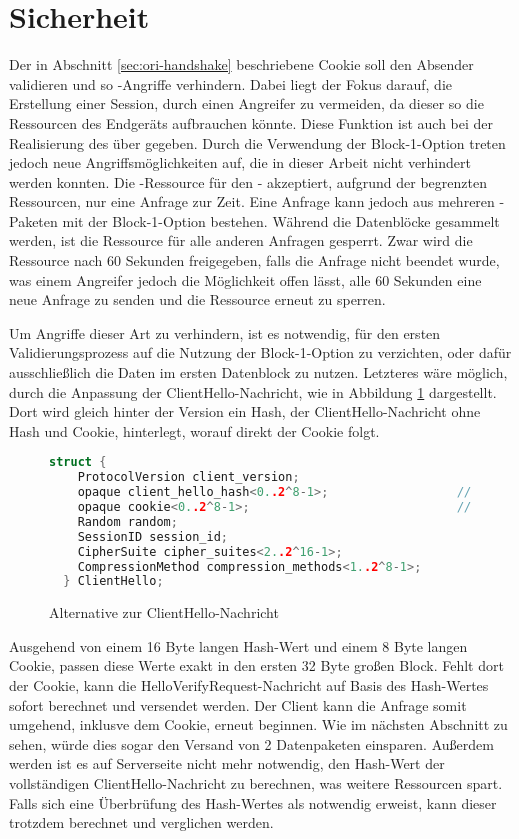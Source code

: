 \section{Sicherheit}

Der in Abschnitt \ref{sec:ori-handshake} beschriebene Cookie soll den Absender validieren und so -Angriffe verhindern.
Dabei liegt der Fokus darauf, die Erstellung einer Session, durch einen Angreifer zu vermeiden, da dieser so die Ressourcen des Endgeräts aufbrauchen könnte.
Diese Funktion ist auch bei der Realisierung des  über  gegeben. Durch die Verwendung der Block-1-Option treten jedoch neue
Angriffsmöglichkeiten auf, die in dieser Arbeit nicht verhindert werden konnten. Die -Ressource für den - akzeptiert, aufgrund
der begrenzten Ressourcen, nur eine Anfrage zur Zeit. Eine Anfrage kann jedoch aus mehreren -Paketen mit der Block-1-Option bestehen. Während
die Datenblöcke gesammelt werden, ist die Ressource für alle anderen Anfragen gesperrt. Zwar wird die Ressource nach 60 Sekunden freigegeben, falls die Anfrage
nicht beendet wurde, was einem Angreifer jedoch die Möglichkeit offen lässt, alle 60 Sekunden eine neue Anfrage zu senden und die Ressource erneut zu sperren.

Um Angriffe dieser Art zu verhindern, ist es notwendig, für den ersten Validierungsprozess auf die Nutzung der Block-1-Option zu verzichten, oder dafür ausschließlich
die Daten im ersten Datenblock zu nutzen. Letzteres wäre möglich, durch die Anpassung der ClientHello-Nachricht, wie in Abbildung \ref{fig:clienthelloalternative} dargestellt.
Dort wird gleich hinter der Version ein Hash, der ClientHello-Nachricht ohne Hash und Cookie, hinterlegt, worauf direkt der Cookie folgt.

\begin{figure}[ht]
  \centering
  \begin{lstlisting}[language=c]
  struct {
    ProtocolVersion client_version;
    opaque client_hello_hash<0..2^8-1>;                  // New field
    opaque cookie<0..2^8-1>;                             // New field
    Random random;
    SessionID session_id;
    CipherSuite cipher_suites<2..2^16-1>;
    CompressionMethod compression_methods<1..2^8-1>;
  } ClientHello;
  \end{lstlisting}
  \caption{Alternative zur ClientHello-Nachricht}
  \label{fig:clienthelloalternative}
\end{figure}

Ausgehend von einem 16 Byte langen Hash-Wert und einem 8 Byte langen Cookie, passen diese Werte exakt in den ersten 32 Byte großen Block. Fehlt dort der Cookie,
kann die HelloVerifyRequest-Nachricht auf Basis des Hash-Wertes sofort berechnet und versendet werden. Der Client kann die Anfrage somit umgehend, inklusve dem
Cookie, erneut beginnen. Wie im nächsten Abschnitt zu sehen, würde dies sogar den Versand von 2 Datenpaketen einsparen. Außerdem werden ist es auf Serverseite
nicht mehr notwendig, den Hash-Wert der vollständigen ClientHello-Nachricht zu berechnen, was weitere Ressourcen spart. Falls sich eine Überbrüfung des Hash-Wertes
als notwendig erweist, kann dieser trotzdem berechnet und verglichen werden.
